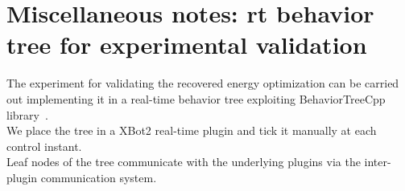 \documentclass[letterpaper, 10 pt, conference]{ieeeconf}  %
\begin{document}
\section{Miscellaneous notes: rt behavior tree for experimental validation}\label{section::rt_bt}
The experiment for validating the recovered energy optimization can be carried out implementing it in a real-time behavior tree exploiting BehaviorTreeCpp library~\cite{misc::colledanchise2021implementation}.\\
We place the tree in a XBot2 real-time plugin and tick it manually at each control instant.\\
Leaf nodes of the tree communicate with the underlying plugins via the inter-plugin communication system.

\clearpage


\end{document}
